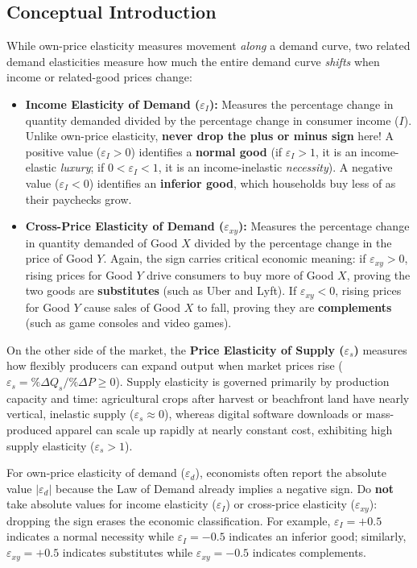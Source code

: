 \documentclass[11pt,letterpaper]{article}
\begin{document}
\subsection*{Conceptual Introduction}
While own-price elasticity measures movement \emph{along} a demand curve, two related demand elasticities measure how much the entire demand curve \emph{shifts} when income or related-good prices change:
\begin{itemize}
    \item \textbf{Income Elasticity of Demand ($\varepsilon_I$):} Measures the percentage change in quantity demanded divided by the percentage change in consumer income ($I$). Unlike own-price elasticity, \textbf{never drop the plus or minus sign} here! A positive value ($\varepsilon_I > 0$) identifies a \textbf{normal good} (if $\varepsilon_I > 1$, it is an income-elastic \emph{luxury}; if $0 < \varepsilon_I < 1$, it is an income-inelastic \emph{necessity}). A negative value ($\varepsilon_I < 0$) identifies an \textbf{inferior good}, which households buy less of as their paychecks grow.
    \item \textbf{Cross-Price Elasticity of Demand ($\varepsilon_{xy}$):} Measures the percentage change in quantity demanded of Good $X$ divided by the percentage change in the price of Good $Y$. Again, the sign carries critical economic meaning: if $\varepsilon_{xy} > 0$, rising prices for Good $Y$ drive consumers to buy more of Good $X$, proving the two goods are \textbf{substitutes} (such as Uber and Lyft). If $\varepsilon_{xy} < 0$, rising prices for Good $Y$ cause sales of Good $X$ to fall, proving they are \textbf{complements} (such as game consoles and video games).
\end{itemize}

On the other side of the market, the \textbf{Price Elasticity of Supply ($\varepsilon_s$)} measures how flexibly producers can expand output when market prices rise ($\varepsilon_s = \%\Delta Q_s / \%\Delta P \ge 0$). Supply elasticity is governed primarily by production capacity and time: agricultural crops after harvest or beachfront land have nearly vertical, inelastic supply ($\varepsilon_s \approx 0$), whereas digital software downloads or mass-produced apparel can scale up rapidly at nearly constant cost, exhibiting high supply elasticity ($\varepsilon_s > 1$).

\begin{tcolorbox}[colback=CourseAmber!12!white,colframe=CourseOrange,title=\textbf{Clear It Up: Why You Must Keep the Sign for $\varepsilon_I$ and $\varepsilon_{xy}$}]
For own-price elasticity of demand ($\varepsilon_d$), economists often report the absolute value $|\varepsilon_d|$ because the Law of Demand already implies a negative sign. Do \textbf{not} take absolute values for income elasticity ($\varepsilon_I$) or cross-price elasticity ($\varepsilon_{xy}$): dropping the sign erases the economic classification. For example, $\varepsilon_I = +0.5$ indicates a normal necessity while $\varepsilon_I = -0.5$ indicates an inferior good; similarly, $\varepsilon_{xy} = +0.5$ indicates substitutes while $\varepsilon_{xy} = -0.5$ indicates complements.
\end{tcolorbox}
\end{document}
